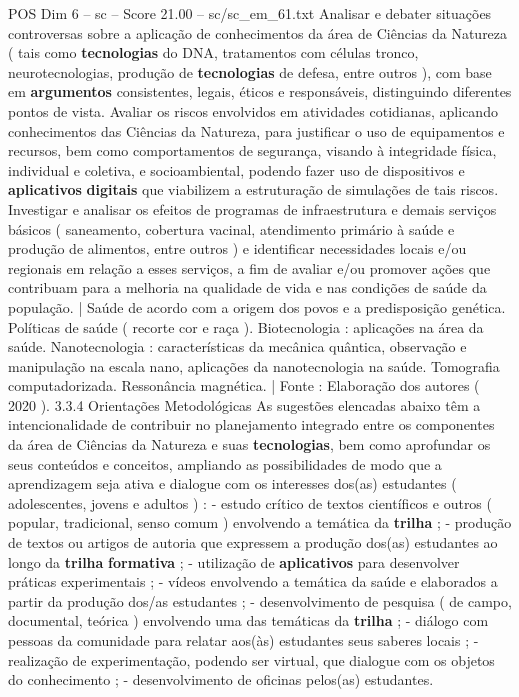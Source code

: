 \begin{textsample}{POS Dim 6 – sc – Score 21.00 – sc/sc\_em\_61.txt}
Analisar e debater situações controversas sobre a aplicação de conhecimentos da área de Ciências da Natureza ( tais como \textbf{tecnologias} do DNA, tratamentos com células tronco, neurotecnologias, produção de \textbf{tecnologias} de defesa, entre outros ), com base em \textbf{argumentos} consistentes, legais, éticos e responsáveis, distinguindo diferentes pontos de vista.
Avaliar os riscos envolvidos em atividades cotidianas, aplicando conhecimentos das Ciências da Natureza, para justificar o uso de equipamentos e recursos, bem como comportamentos de segurança, visando à integridade física, individual e coletiva, e socioambiental, podendo fazer uso de dispositivos e \textbf{aplicativos} \textbf{digitais} que viabilizem a estruturação de simulações de tais riscos.
Investigar e analisar os efeitos de programas de infraestrutura e demais serviços básicos ( saneamento, cobertura vacinal, atendimento primário à saúde e produção de alimentos, entre outros ) e identificar necessidades locais e/ou regionais em relação a esses serviços, a fim de avaliar e/ou promover ações que contribuam para a melhoria na qualidade de vida e nas condições de saúde da população. | Saúde de acordo com a origem dos povos e a predisposição genética.
Políticas de saúde ( recorte cor e raça ).
Biotecnologia : aplicações na área da saúde.
Nanotecnologia : características da mecânica quântica, observação e manipulação na escala nano, aplicações da nanotecnologia na saúde.
Tomografia computadorizada.
Ressonância magnética. | Fonte : Elaboração dos autores ( 2020 ). 3.3.4 Orientações Metodológicas As sugestões elencadas abaixo têm a intencionalidade de contribuir no planejamento integrado entre os componentes da área de Ciências da Natureza e suas \textbf{tecnologias}, bem como aprofundar os seus conteúdos e conceitos, ampliando as possibilidades de modo que a aprendizagem seja ativa e dialogue com os interesses dos(as) estudantes ( adolescentes, jovens e adultos ) : - estudo crítico de textos científicos e outros ( popular, tradicional, senso comum ) envolvendo a temática da \textbf{trilha} ; - produção de textos ou artigos de autoria que expressem a produção dos(as) estudantes ao longo da \textbf{trilha} \textbf{formativa} ; - utilização de \textbf{aplicativos} para desenvolver práticas experimentais ; - vídeos envolvendo a temática da saúde e elaborados a partir da produção dos/as estudantes ; - desenvolvimento de pesquisa ( de campo, documental, teórica ) envolvendo uma das temáticas da \textbf{trilha} ; - diálogo com pessoas da comunidade para relatar aos(às) estudantes seus saberes locais ; - realização de experimentação, podendo ser virtual, que dialogue com os objetos do conhecimento ; - desenvolvimento de oficinas pelos(as) estudantes.

\end{textsample}
